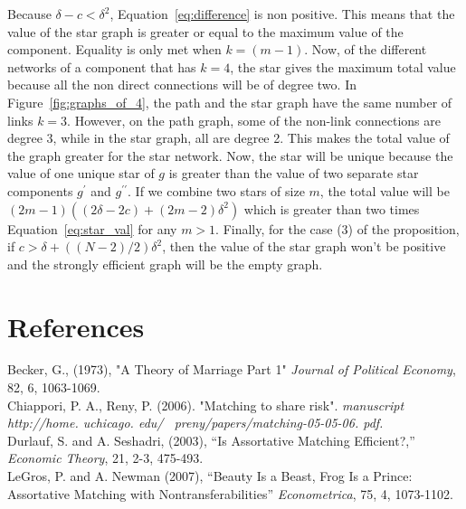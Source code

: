 \documentclass[a4paper, 11pt]{article}
\begin{document}
Because $\delta - c < \delta^2$, Equation~\ref{eq:difference} is non positive. This means that the value of the star graph is greater or equal to the maximum value of the component. Equality is only met when $k = (m-1)$. Now, of the different networks of a component that has $k = 4$, the star gives the maximum total value because all the non direct connections will be of degree two. In Figure~\ref{fig:graphs_of_4}, the path and the star graph have the same number of links $k = 3$. However, on the path graph, some of the non-link connections are degree 3, while in the star graph, all are degree 2. This makes the total value of the graph greater for the star network. Now, the star will be unique because the value of one unique star of $g$ is greater than the value of two separate star components $g^\prime$ and $g^{\prime\prime}$. If we combine two stars of size $m$, the total value will be $(2m-1)((2\delta - 2c) + (2m-2)\delta^2)$ which is greater than two times Equation~\ref{eq:star_val} for any $m > 1$. Finally, for the case (3) of the proposition, if $c > \delta + ((N-2)/2)\delta^2$, then the value of the star graph won't be positive and the strongly efficient graph will be the empty graph.


\newpage
\section*{References}
\begin{hangparas}{.25in}{1}
Becker, G., (1973), "A Theory of Marriage Part 1" \textit{Journal of Political Economy}, 82, 6, 1063-1069.\\

Chiappori, P. A., Reny, P. (2006). "Matching to share risk". \textit{manuscript http://home. uchicago. edu/~ preny/papers/matching-05-05-06. pdf.}\\

Durlauf, S. and A. Seshadri, (2003), “Is Assortative Matching Efficient?,” \textit{Economic Theory}, 21, 2-3, 475-493.\\

LeGros, P. and A. Newman (2007), “Beauty Is a Beast, Frog Is a Prince: Assortative Matching with Nontransferabilities” \textit{Econometrica}, 75, 4, 1073-1102.

\end{hangparas}
\end{document}
